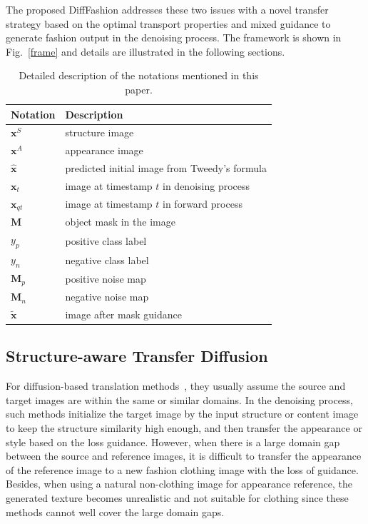 The proposed DiffFashion addresses these two issues with a novel transfer strategy based on the optimal transport properties and mixed guidance to generate fashion output in the denoising process. The framework is shown in Fig.~\ref{frame} and details are illustrated in the following sections.



\begin{table}[htbp]
  \centering
  \caption{Detailed description of the notations mentioned in this paper.}
  \label{tab:parameters}
  \begin{tabular}[width=1\textwidth]{l|l}
    \toprule
    Notation & Description \\
    \midrule
    $\mathbf{x}^S$ & structure image \\
    $\mathbf{x}^A$ & appearance image \\
    $\hat{\mathbf{x}}$ & predicted initial image from Tweedy's formula \\
    $\mathbf{x}_t$ & image at timestamp $t$ in denoising process\\
    $\mathbf{x}_{qt}$ & image at timestamp $t$ in forward process\\
    $\boldsymbol{M}$ & object mask in the image\\
    $y_p$ & positive class label \\
    $y_n$ & negative class label \\
    $\boldsymbol{M}_p$ & positive noise map\\
    $\boldsymbol{M}_n$ & negative noise map\\
    $\tilde{\mathbf{x}}$ & image after mask guidance\\
    \bottomrule
  \end{tabular}
\end{table}

\subsection{Structure-aware Transfer Diffusion}

For diffusion-based translation methods~\cite{kwon2022diffusion,kim2022diffusionclip}, they usually assume the source and target images are within the same or similar domains. In the denoising process, such methods initialize the target image by the input structure or content image to keep the structure similarity high enough, and then transfer the appearance or style based on the loss guidance. However, when there is a large domain gap between the source and reference images, it is difficult to transfer the appearance of the reference image to a new fashion clothing image with the loss of guidance. Besides, when using a natural non-clothing image for appearance reference, the generated texture becomes unrealistic and not suitable for clothing since these methods cannot well cover the large domain gaps.

